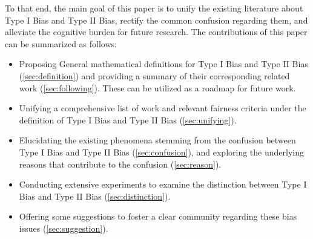 To that end, the main goal of this paper is to unify the existing literature about Type I Bias and Type II Bias, rectify the common confusion regarding them, and alleviate the cognitive burden for future research.
The contributions of this paper can be summarized as follows:
\begin{itemize}
    \item Proposing General mathematical definitions for Type I Bias and Type II Bias (\cref{sec:definition}) and providing a summary of their corresponding related work (\cref{sec:following}). These can be utilized as a roadmap for future work.

    \item Unifying a comprehensive list of work and relevant fairness criteria under the definition of Type I Bias and Type II Bias (\cref{sec:unifying}).
    
    \item Elucidating the existing phenomena stemming from the confusion between Type I Bias and Type II Bias (\cref{sec:confusion}), and exploring the underlying reasons that contribute to the confusion (\cref{sec:reason}).

    \item Conducting extensive experiments to examine the distinction between Type I Bias and Type II Bias (\cref{sec:distinction}).

    \item Offering some suggestions to foster a clear community regarding these bias issues (\cref{sec:suggestion}).
    
\end{itemize}
